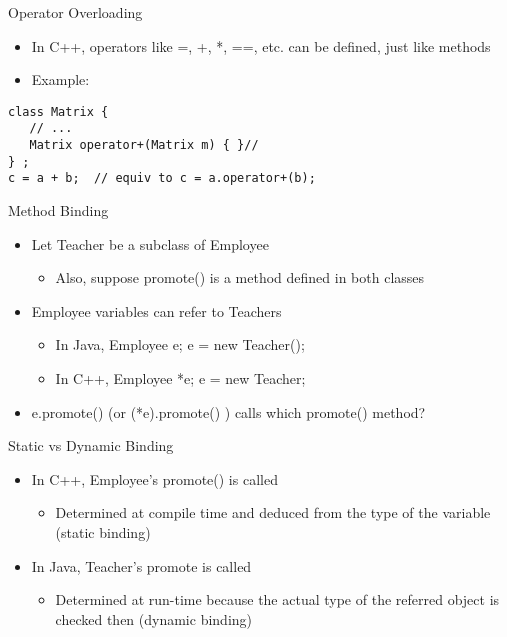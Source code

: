 \documentclass{beamer}
\begin{document}
\begin{frame}[fragile]{Operator Overloading}
\begin{itemize}
\item In C++, operators like =, +, *, ==, etc. can be defined, just like methods
\item Example:
\end{itemize}
\begin{lstlisting}
class Matrix {
   // ...
   Matrix operator+(Matrix m) { }//
} ;
c = a + b;  // equiv to c = a.operator+(b);
\end{lstlisting}
\end{frame}

\begin{frame}{Method Binding}
\begin{itemize}
\item Let Teacher be a subclass of Employee \\
\begin{itemize}
\item Also, suppose promote() is a method defined in both classes
\end{itemize}
\item Employee variables can refer to Teachers
\begin{itemize}
\item In Java, Employee e; e = new Teacher();
\item In C++, Employee *e; e = new Teacher;
\end{itemize}
\item e.promote() (or (*e).promote() ) calls which promote() method?
\end{itemize}
\end{frame}

\begin{frame}{Static vs Dynamic Binding}
\begin{itemize}
\item In C++, Employee's promote() is called
\begin{itemize}
\item Determined at compile time and deduced from the type of the variable (static binding)
\end{itemize}
\item In Java, Teacher's promote is called
\begin{itemize}
\item Determined at run-time because the actual type of the referred object is checked then (dynamic binding)
\end{itemize}
\end{itemize}
\end{frame}
\end{document}
